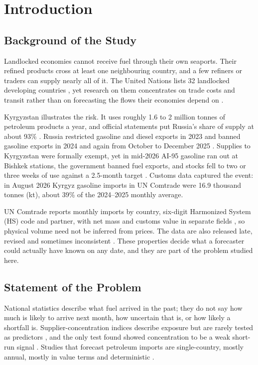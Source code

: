 \documentclass[conference]{IEEEtran}
\begin{document}
\section{Introduction}\label{sec:intro}

\subsection{Background of the Study}
Landlocked economies cannot receive fuel through their own seaports. Their refined products cross at least one neighbouring country, and a few refiners or traders can supply nearly all of it. The United Nations lists 32 landlocked developing countries \cite{ohrlls}, yet research on them concentrates on trade costs and transit rather than on forecasting the flows their economies depend on \cite{wto2021}.

Kyrgyzstan illustrates the risk. It uses roughly 1.6 to 2 million tonnes of petroleum products a year, and official statements put Russia's share of supply at about 93\% \cite{economist_stocks,kg24_exempt}. Russia restricted gasoline and diesel exports in 2023 and banned gasoline exports in 2024 and again from October to December 2025 \cite{gta2023,gta2025}. Supplies to Kyrgyzstan were formally exempt, yet in mid-2026 AI-95 gasoline ran out at Bishkek stations, the government banned fuel exports, and stocks fell to two or three weeks of use against a 2.5-month target \cite{kunuz2026,kwan2026}. Customs data captured the event: in August 2026 Kyrgyz gasoline imports in UN Comtrade were 16.9 thousand tonnes (kt), about 39\% of the 2024--2025 monthly average.

UN Comtrade reports monthly imports by country, six-digit Harmonized System (HS) code and partner, with net mass and customs value in separate fields \cite{comtrade}, so physical volume need not be inferred from prices. The data are also released late, revised and sometimes inconsistent \cite{hu2022}. These properties decide what a forecaster could actually have known on any date, and they are part of the problem studied here.

\subsection{Statement of the Problem}
National statistics describe what fuel arrived in the past; they do not say how much is likely to arrive next month, how uncertain that is, or how likely a shortfall is. Supplier-concentration indices describe exposure but are rarely tested as predictors \cite{ang2015}, and the only test found showed concentration to be a weak short-run signal \cite{kwon2026}. Studies that forecast petroleum imports are single-country, mostly annual, mostly in value terms and deterministic \cite{santi2023,qin2026}.
\end{document}
